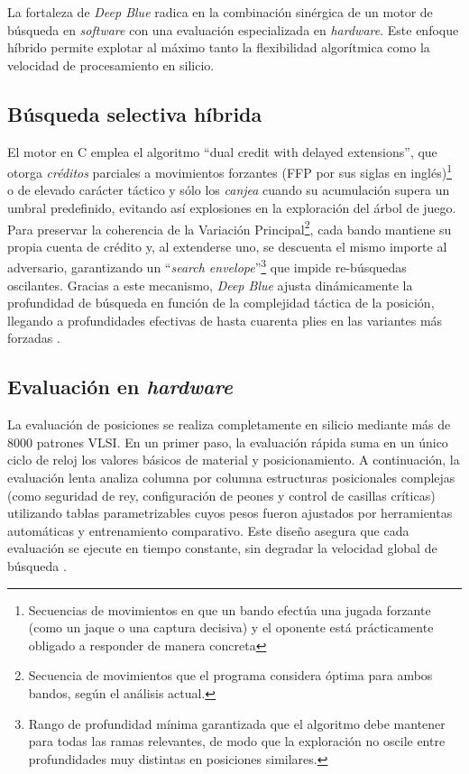 \documentclass[a4paper, 12pt]{article}
\begin{document}
La fortaleza de \textit{Deep Blue} radica en la combinación 
sinérgica de un motor de búsqueda en \emph{software} con una evaluación 
especializada en \emph{hardware}. Este enfoque híbrido permite 
explotar al máximo tanto la flexibilidad algorítmica como la 
velocidad de procesamiento en silicio.

\subsection{Búsqueda selectiva híbrida}

El motor en C emplea el algoritmo “dual credit with delayed 
extensions”, que otorga \emph{créditos} parciales a movimientos 
forzantes (FFP por sus siglas en inglés)\footnote{Secuencias de movimientos en que un 
bando efectúa una jugada forzante (como un jaque o una captura decisiva)
y el oponente está prácticamente obligado a responder de manera 
concreta} o de elevado carácter táctico  y sólo los 
\emph{canjea} cuando su acumulación supera un umbral predefinido, 
evitando así explosiones en la exploración del árbol de juego. 
Para preservar la coherencia de la 
Variación Principal\footnote{Secuencia de movimientos que el programa considera óptima para ambos bandos, según el análisis actual.}, 
cada bando mantiene su propia cuenta de 
crédito y, al extenderse uno, se descuenta el mismo importe al 
adversario, garantizando un “\emph{search envelope}”\footnote{Rango 
de profundidad mínima garantizada que el algoritmo debe mantener 
para todas las ramas relevantes, de modo que la exploración no 
oscile entre profundidades muy distintas en posiciones similares.} 
que impide 
re-búsquedas oscilantes. Gracias a este 
mecanismo, \textit{Deep Blue} ajusta dinámicamente la 
profundidad de búsqueda en función de la complejidad táctica de 
la posición, llegando a profundidades efectivas de hasta 
cuarenta plies en las variantes más forzadas \cite{campbell1999search}.

\subsection{Evaluación en \emph{hardware}}

La evaluación de posiciones se realiza completamente en 
silicio mediante más de 8000 patrones VLSI. En un primer paso, 
la evaluación rápida suma en un único ciclo de reloj los valores 
básicos de material y posicionamiento. A continuación, la 
evaluación lenta analiza columna por columna estructuras 
posicionales complejas (como seguridad de rey, configuración de 
peones y control de casillas críticas) utilizando tablas 
parametrizables cuyos pesos fueron ajustados por herramientas 
automáticas y entrenamiento comparativo. Este diseño asegura que cada 
evaluación se ejecute en tiempo constante, sin degradar la 
velocidad global de búsqueda \cite{campbell1999search}.
\end{document}
